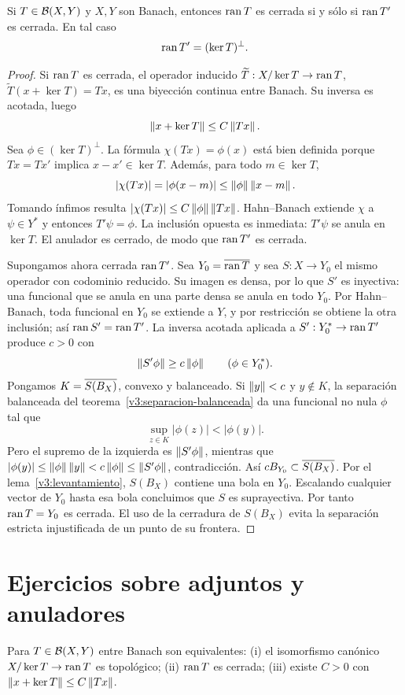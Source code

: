 \begin{teorema}\label{v3:rango-cerrado}
Si $T\in\mathcal B(X,Y)$ y $X,Y$ son Banach, entonces $\operatorname{ran} T$ es cerrada si y sólo si $\operatorname{ran} T'$ es cerrada. En tal caso
\[\operatorname{ran} T'=(\ker T)^\perp.
\]
\end{teorema}
\begin{proof}
Si $\operatorname{ran} T$ es cerrada, el operador inducido $\widetilde T:X/\ker T\to\operatorname{ran} T$, $\widetilde T(x+\ker T)=Tx$, es una biyección continua entre Banach. Su inversa es acotada, luego
\[\left\lVert x+\ker T\right\rVert\le C\left\lVert Tx\right\rVert.
\]
Sea $\phi\in(\ker T)^\perp$. La fórmula $\chi(Tx)=\phi(x)$ está bien definida porque $Tx=Tx'$ implica $x-x'\in\ker T$. Además, para todo $m\in\ker T$,
\[|\chi(Tx)|=|\phi(x-m)|\le\left\lVert\phi\right\rVert\left\lVert x-m\right\rVert.
\]
Tomando ínfimos resulta $|\chi(Tx)|\le C\left\lVert\phi\right\rVert\left\lVert Tx\right\rVert$. Hahn--Banach extiende $\chi$ a $\psi\in Y^*$ y entonces $T'\psi=\phi$. La inclusión opuesta es inmediata: $T'\psi$ se anula en $\ker T$. El anulador es cerrado, de modo que $\operatorname{ran} T'$ es cerrada.

Supongamos ahora cerrada $\operatorname{ran} T'$. Sea $Y_0=\overline{\operatorname{ran} T}$ y sea $S:X\to Y_0$ el mismo operador con codominio reducido. Su imagen es densa, por lo que $S'$ es inyectiva: una funcional que se anula en una parte densa se anula en todo $Y_0$. Por Hahn--Banach, toda funcional en $Y_0$ se extiende a $Y$, y por restricción se obtiene la otra inclusión; así $\operatorname{ran} S'=\operatorname{ran} T'$. La inversa acotada aplicada a $S':Y_0^*\to\operatorname{ran} T'$ produce $c>0$ con
\[\left\lVert S'\phi\right\rVert\ge c\left\lVert\phi\right\rVert\qquad(\phi\in Y_0^*).
\]
Pongamos $K=\overline{S(B_X)}$, convexo y balanceado. Si $\left\lVert y\right\rVert<c$ y $y\notin K$, la separación balanceada del teorema~\ref{v3:separacion-balanceada} da una funcional no nula $\phi$ tal que
\[\sup_{z\in K}|\phi(z)|<|\phi(y)|.
\]
Pero el supremo de la izquierda es $\left\lVert S'\phi\right\rVert$, mientras que $|\phi(y)|\le\left\lVert\phi\right\rVert\left\lVert y\right\rVert<c\left\lVert\phi\right\rVert\le\left\lVert S'\phi\right\rVert$, contradicción. Así $cB_{Y_0}\subset\overline{S(B_X)}$. Por el lema~\ref{v3:levantamiento}, $S(B_X)$ contiene una bola en $Y_0$. Escalando cualquier vector de $Y_0$ hasta esa bola concluimos que $S$ es suprayectiva. Por tanto $\operatorname{ran} T=Y_0$ es cerrada. El uso de la cerradura de $S(B_X)$ evita la separación estricta injustificada de un punto de su frontera.
\end{proof}

\section{Ejercicios sobre adjuntos y anuladores}
\begin{ejercicio}\label{ej:v3-l04-1}
Para $T\in\mathcal B(X,Y)$ entre Banach son equivalentes: (i) el isomorfismo canónico $X/\ker T\to\operatorname{ran} T$ es topológico; (ii) $\operatorname{ran} T$ es cerrada; (iii) existe $C>0$ con $\left\lVert x+\ker T\right\rVert\le C\left\lVert Tx\right\rVert$.
\end{ejercicio}


